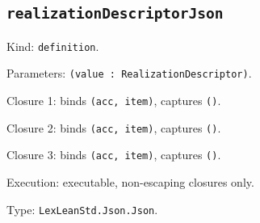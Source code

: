 \documentclass[11pt]{article}
\begin{document}
\subsection*{\texttt{realizationDescriptorJson}}
\noindent Kind: \texttt{definition}.\par
\noindent Parameters: \texttt{(value : RealizationDescriptor)}.\par
\noindent Closure 1: binds \texttt{(acc, item)}, captures \texttt{()}.\par
\noindent Closure 2: binds \texttt{(acc, item)}, captures \texttt{()}.\par
\noindent Closure 3: binds \texttt{(acc, item)}, captures \texttt{()}.\par
\noindent Execution: executable, non-escaping closures only.\par
\noindent Type: \texttt{LexLeanStd.Json.Json}.\par
\end{document}
